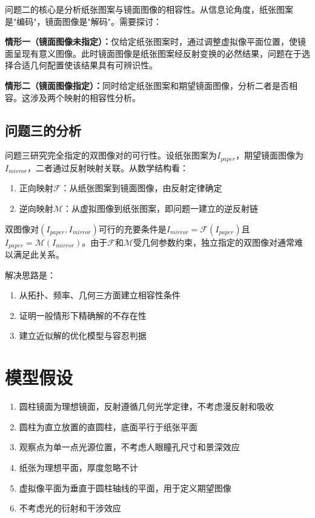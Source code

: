 \documentclass[withoutpreface]{cumcmthesis}
\begin{document}
问题二的核心是分析纸张图案与镜面图像的相容性。从信息论角度，纸张图案是"编码"，镜面图像是"解码"。需要探讨：

\textbf{情形一（镜面图像未指定）：}仅给定纸张图案时，通过调整虚拟像平面位置，使镜面呈现有意义图像。此时镜面图像是纸张图案经反射变换的必然结果，问题在于选择合适几何配置使该结果具有可辨识性。

\textbf{情形二（镜面图像指定）：}同时给定纸张图案和期望镜面图像，分析二者是否相容。这涉及两个映射的相容性分析。

\subsection{问题三的分析}

问题三研究完全指定的双图像对的可行性。设纸张图案为$I_{paper}$，期望镜面图像为$I_{mirror}$，二者通过反射映射关联。从数学结构看：

\begin{enumerate}
    \item 正向映射$\mathcal{F}$：从纸张图案到镜面图像，由反射定律确定
    \item 逆向映射$\mathcal{M}$：从虚拟图像到纸张图案，即问题一建立的逆反射链
\end{enumerate}

双图像对$(I_{paper}, I_{mirror})$可行的充要条件是$I_{mirror}=\mathcal{F}(I_{paper})$且$I_{paper}=\mathcal{M}(I_{mirror})$。由于$\mathcal{F}$和$\mathcal{M}$受几何参数约束，独立指定的双图像对通常难以满足此关系。

解决思路是：
\begin{enumerate}
    \item 从拓扑、频率、几何三方面建立相容性条件
    \item 证明一般情形下精确解的不存在性
    \item 建立近似解的优化模型与容忍判据
\end{enumerate}

\section{模型假设}

\begin{enumerate}
    \item 圆柱镜面为理想镜面，反射遵循几何光学定律，不考虑漫反射和吸收
    \item 圆柱为直立放置的直圆柱，底面平行于纸张平面
    \item 观察点为单一点光源位置，不考虑人眼瞳孔尺寸和景深效应
    \item 纸张为理想平面，厚度忽略不计
    \item 虚拟像平面为垂直于圆柱轴线的平面，用于定义期望图像
    \item 不考虑光的衍射和干涉效应
\end{enumerate}
\end{document}
